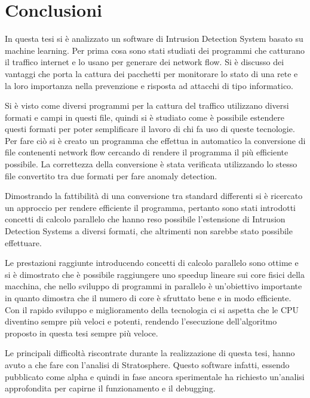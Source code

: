 \documentclass[../main.tex]{subfiles}
\begin{document}
\chapter{Conclusioni}
In questa tesi si è analizzato un software di Intrusion Detection System basato su machine learning. Per prima cosa sono stati studiati dei programmi che catturano il traffico internet e lo usano per generare dei network flow. Si è discusso dei vantaggi che porta la cattura dei pacchetti per monitorare lo stato di una rete e la loro importanza nella prevenzione e risposta ad attacchi di tipo informatico. 

Si è visto come diversi programmi per la cattura del traffico utilizzano diversi formati e campi in questi file, quindi si è studiato come è possibile estendere questi formati per poter semplificare il lavoro di chi fa uso di queste tecnologie. Per fare ciò si è creato un programma che effettua in automatico la conversione di file contenenti network flow cercando di rendere il programma il più efficiente possibile. La correttezza della conversione è stata verificata utilizzando lo stesso file convertito tra due formati per fare anomaly detection.

Dimostrando la fattibilità di una conversione tra standard differenti si è ricercato un approccio per rendere efficiente il programma, pertanto sono stati introdotti concetti di calcolo parallelo che hanno reso possibile l'estensione di Intrusion Detection Systems a diversi formati, che altrimenti non sarebbe stato possibile effettuare.

Le prestazioni raggiunte introducendo concetti di calcolo parallelo sono ottime e si è dimostrato che è possibile raggiungere uno speedup lineare sui core fisici della macchina, che nello sviluppo di programmi in parallelo è un'obiettivo importante in quanto dimostra che il numero di core è sfruttato bene e in modo efficiente. Con il rapido sviluppo e miglioramento della tecnologia ci si aspetta che le CPU diventino sempre più veloci e potenti, rendendo l'esecuzione dell'algoritmo proposto in questa tesi sempre più veloce. 

Le principali difficoltà riscontrate durante la realizzazione di questa tesi, hanno avuto a che fare con l'analisi di Stratosphere. Questo software infatti, essendo pubblicato come alpha e quindi in fase ancora sperimentale ha richiesto un'analisi approfondita per capirne il funzionamento e il debugging.
\end{document}

